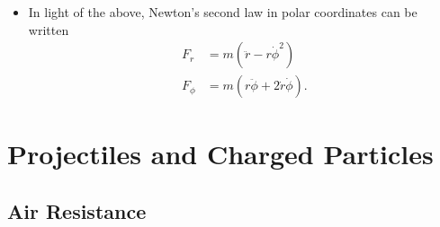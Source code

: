 \documentclass{article}
\begin{document}
\begin{itemize}
  \item In light of the above, Newton's second law in polar coordinates can be written \begin{align*}
          F_r    & = m (\ddot{r} - r \dot{\phi}^2)             \\
          F_\phi & = m (r \ddot{\phi} + 2 \dot{r} \dot{\phi}).
        \end{align*}
\end{itemize}

\section{Projectiles and Charged Particles}

\subsection{Air Resistance}
\end{document}
